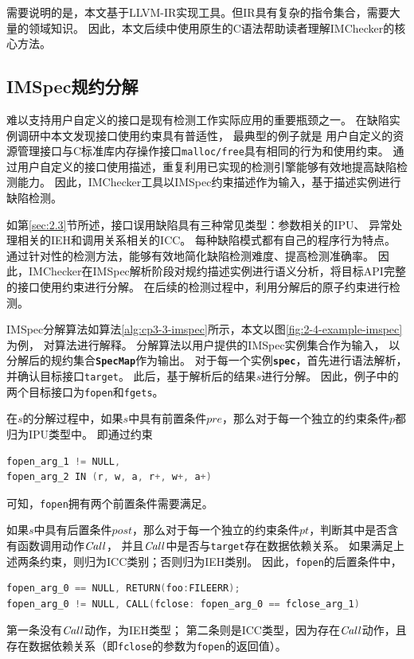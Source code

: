 需要说明的是，本文基于LLVM-IR实现工具。但IR具有复杂的指令集合，需要大量的领域知识。
因此，本文后续中使用原生的C语法帮助读者理解IMChecker的核心方法。

\subsection{IMSpec规约分解}
难以支持用户自定义的接口是现有检测工作实际应用的重要瓶颈之一。
在缺陷实例调研中本文发现接口使用约束具有普适性，
最典型的例子就是
用户自定义的资源管理接口与C标准库内存操作接口\texttt{malloc/free}具有相同的行为和使用约束。
通过用户自定义的接口使用描述，重复利用已实现的检测引擎能够有效地提高缺陷检测能力。
因此，IMChecker工具以IMSpec约束描述作为输入，基于描述实例进行缺陷检测。

如第\ref{sec:2.3}节所述，接口误用缺陷具有三种常见类型：参数相关的IPU、
异常处理相关的IEH和调用关系相关的ICC。
每种缺陷模式都有自己的程序行为特点。
通过针对性的检测方法，能够有效地简化缺陷检测难度、提高检测准确率。
因此，IMChecker在IMSpec解析阶段对规约描述实例进行语义分析，将目标API完整的接口使用约束进行分解。
在后续的检测过程中，利用分解后的原子约束进行检测。



IMSpec分解算法如算法\ref{alg:cp3-3-imspec}所示，本文以图\ref{fig:2-4-example-imspec}为例，
对算法进行解释。
分解算法以用户提供的IMSpec实例集合作为输入，
以分解后的规约集合\textbf{\texttt{SpecMap}}作为输出。
对于每一个实例\textbf{\texttt{spec}}，首先进行语法解析，并确认目标接口\texttt{target}。
此后，基于解析后的结果$s$进行分解。
因此，例子中的两个目标接口为\texttt{fopen}和\texttt{fgets}。

在$s$的分解过程中，如果$s$中具有前置条件$pre$，那么对于每一个独立的约束条件$p$都归为IPU类型中。
即通过约束
\begin{lstlisting}[language={C},
basicstyle=\linespread{0.8}\listingsfont,
numbers=none,
xleftmargin=.25\textwidth]
fopen_arg_1 != NULL,
fopen_arg_2 IN (r, w, a, r+, w+, a+)
\end{lstlisting}
可知，\texttt{fopen}拥有两个前置条件需要满足。

如果$s$中具有后置条件$post$，那么对于每一个独立的约束条件$pt$，判断其中是否含有函数调用动作$\mathit{Call}$，
并且$\mathit{Call}$中是否与\texttt{target}存在数据依赖关系。
如果满足上述两条约束，则归为ICC类别；否则归为IEH类别。
因此，\texttt{fopen}的后置条件中，
\begin{lstlisting}[language={C},
basicstyle=\linespread{0.8}\listingsfont,
numbers=none,
xleftmargin=.15\textwidth]
fopen_arg_0 == NULL, RETURN(foo:FILEERR);
fopen_arg_0 != NULL, CALL(fclose: fopen_arg_0 == fclose_arg_1)
\end{lstlisting}
第一条没有$\mathit{Call}$动作，为IEH类型；
第二条则是ICC类型，因为存在$\mathit{Call}$动作，且存在数据依赖关系（即\texttt{fclose}的参数为\texttt{fopen}的返回值）。

